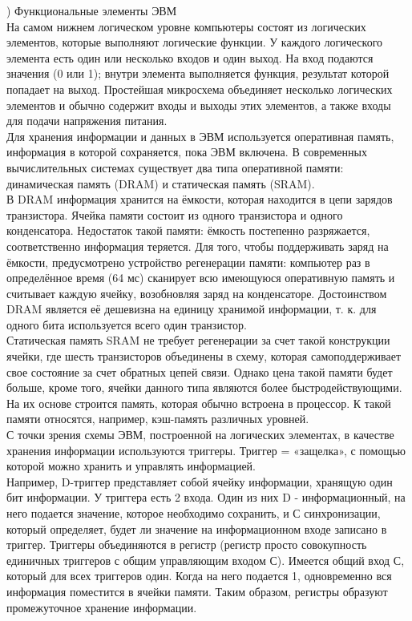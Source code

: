 ) Функциональные элементы ЭВМ \\
На самом нижнем логическом уровне компьютеры состоят из логических элементов, которые выполняют логические функции. У каждого логического элемента есть один или несколько входов и один выход. На вход подаются значения (0 или 1); внутри элемента выполняется функция, результат которой попадает на выход. Простейшая микросхема объединяет несколько логических элементов и обычно содержит входы и выходы этих элементов, а также входы для подачи напряжения питания. \\
Для хранения информации и данных в ЭВМ используется оперативная память, информация в которой сохраняется, пока ЭВМ включена. В современных вычислительных системах существует два типа оперативной памяти: динамическая память (DRAM) и статическая память (SRAM). \\
В DRAM информация хранится на ёмкости, которая находится в цепи зарядов транзистора. Ячейка памяти состоит из одного транзистора и одного конденсатора. Недостаток такой памяти: ёмкость постепенно разряжается, соответственно информация теряется. Для того, чтобы поддерживать заряд на ёмкости, предусмотрено устройство регенерации памяти: компьютер раз в определённое время (64 мс) сканирует всю имеющуюся оперативную память и считывает каждую ячейку, возобновляя заряд на конденсаторе. Достоинством DRAM является её дешевизна на единицу хранимой информации, т. к. для одного бита используется всего один транзистор. \\
Статическая память SRAM не требует регенерации за счет такой конструкции ячейки, где шесть транзисторов объединены в схему, которая самоподдерживает свое состояние за счет обратных цепей связи. Однако цена такой памяти будет больше, кроме того, ячейки данного типа являются более быстродействующими. На их основе строится память, которая обычно встроена в процессор. К такой памяти относятся, например, кэш-память различных уровней. \\
С точки зрения схемы ЭВМ, построенной на логических элементах, в качестве хранения информации используются триггеры. Триггер = «защелка», с помощью которой можно хранить и управлять информацией. \\
Например, D-триггер представляет собой ячейку информации, хранящую один бит информации. У триггера есть 2 входа. Один из них D - информационный, на него подается значение, которое необходимо сохранить, и С синхронизации, который определяет, будет ли значение на информационном входе записано в триггер. Триггеры объединяются в регистр (регистр просто совокупность единичных триггеров с общим управляющим входом С). Имеется общий вход С, который для всех триггеров один. Когда на него подается 1, одновременно вся информация поместится в ячейки памяти. Таким образом, регистры образуют промежуточное хранение информации. \\

